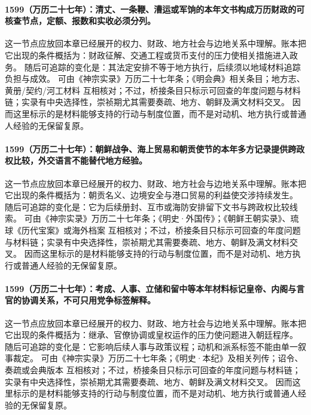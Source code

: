 \paragraph{1599（万历二十七年）：清丈、一条鞭、漕运或军饷的本年文书构成万历财政的可核查节点，定额、报数和实收必须分列。} 这一节点应放回本章已经展开的权力、财政、地方社会与边地关系中理解。账本把它出现的条件概括为：财政征解、交通工程或货币支付的压力使相关措施进入政务。 随后可追踪的变化是：其法定安排不等于地方执行，后续须以地域材料追踪负担与成效。 可由《神宗实录》万历二十七年条；《明会典》相关条目；地方志、黄册/契约/河工材料 互相核对；不过，桥接条目只标示可回查的年度问题与材料链；实录有中央选择性，崇祯期尤其需要奏疏、地方、朝鲜及满文材料交叉。 因而这里标示的是材料能够支持的行动与制度位置，而不是对动机、地方执行或普通人经验的无保留复原。

\paragraph{1599（万历二十七年）：朝鲜战争、海上贸易和朝贡使节的本年多方记录提供跨政权比较，外交语言不能替代地方经验。} 这一节点应放回本章已经展开的权力、财政、地方社会与边地关系中理解。账本把它出现的条件概括为：朝贡名义、边境安全与港口贸易的利益使交涉持续发生。 随后可追踪的变化是：它为后续册封、互市或海防安排留下文书与跨政权比较线索。 可由《神宗实录》万历二十七年条；《明史·外国传》；《朝鲜王朝实录》、琉球《历代宝案》或海外档案 互相核对；不过，桥接条目只标示可回查的年度问题与材料链；实录有中央选择性，崇祯期尤其需要奏疏、地方、朝鲜及满文材料交叉。 因而这里标示的是材料能够支持的行动与制度位置，而不是对动机、地方执行或普通人经验的无保留复原。

\paragraph{1599（万历二十七年）：考成、人事、立储和留中等本年材料标记皇帝、内阁与言官的协调关系，不可只用党争标签解释。} 这一节点应放回本章已经展开的权力、财政、地方社会与边地关系中理解。账本把它出现的条件概括为：继承、官僚协调或皇权运作的压力使问题进入朝廷程序。 随后可追踪的变化是：它影响后续人事与政策议程；动机和派系标签不能由单一叙事裁定。 可由《神宗实录》万历二十七年条；《明史·本纪》及相关列传；诏令、奏疏或会典版本 互相核对；不过，桥接条目只标示可回查的年度问题与材料链；实录有中央选择性，崇祯期尤其需要奏疏、地方、朝鲜及满文材料交叉。 因而这里标示的是材料能够支持的行动与制度位置，而不是对动机、地方执行或普通人经验的无保留复原。

